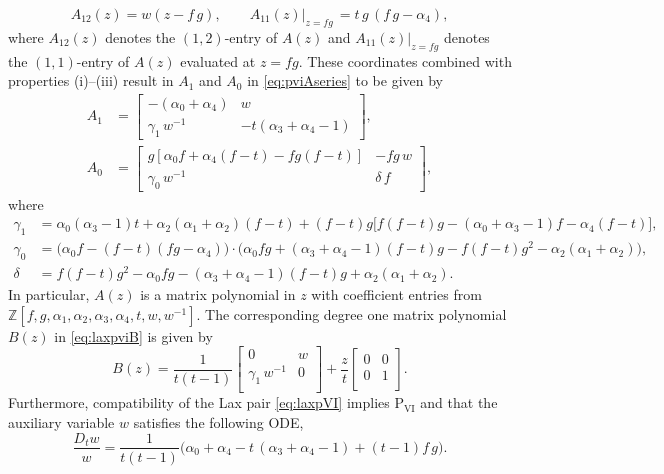\documentclass[a4paper,reqno]{amsart}
\numberwithin{equation}{section}
\numberwithin{figure}{section}
\theoremstyle{remark}
\newcommand\Psix{\textrm{P}_{\textrm{VI}}}
\begin{document}
\begin{equation*}
    A_{12}(z)=w(z-f\,g),\qquad A_{11}(z)|_{z=fg}\,=t\,g\,(f\,g-\alpha_4),
\end{equation*}
where $A_{12}(z)$ denotes the $(1,2)$-entry of $A(z)$ and $A_{11}(z)|_{z=fg}$ denotes the $(1,1)$-entry of $A(z)$ evaluated at $z=fg$. These coordinates combined with properties (i)--(iii) result in $A_1$ and $A_0$ in \eqref{eq:pviAseries} to be given by
\begin{align*}
A_1&=\begin{bmatrix}
 -(\alpha _0+\alpha _4) & w \\
\gamma_1 \,w^{-1} & -t(\alpha _3+\alpha _4-1)
\end{bmatrix},\\
A_0&=\begin{bmatrix}
 g [\alpha _0 f+\alpha _4 (f-t)-f g (f-t)] & -f g\, w \\
 \gamma_0 \,w^{-1} & \delta\, f
\end{bmatrix},
\end{align*}
where
\begin{align*}
    \gamma_1&=\alpha _0 (\alpha _3-1) t+\alpha _2 (\alpha _1+\alpha _2) (f-t)+(f-t)g\big[f (f-t)g-(\alpha _0+\alpha_3-1) f-\alpha _4(f-t)\big],\\
    \gamma_0&=\big(\alpha _0 f-(f-t) (f g-\alpha _4)\big)  \cdot\big(\alpha _0 f g+(\alpha _3+\alpha _4-1)  (f-t)g-f  (f-t)g^2-\alpha _2 (\alpha _1+\alpha _2)\big),\\
    \delta&=f  (f-t)g^2-\alpha _0 f g-(\alpha _3+\alpha _4-1)  (f-t)g+\alpha _2 (\alpha _1+\alpha _2).
\end{align*}
In particular, $A(z)$ is a matrix polynomial in $z$ with coefficient entries from $\mathbb{Z}[f,g,\alpha_1,\alpha_2,\alpha_3,\alpha_4,t,w,w^{-1}]$. The corresponding degree one matrix polynomial $B(z)$ in \eqref{eq:laxpviB} is given by
\begin{equation*}
    B(z)=\frac{1}{t(t-1)}\begin{bmatrix}
 0 & w \\
 \gamma_1\,w^{-1} & 0 \\
\end{bmatrix}+\frac{z}{t}\begin{bmatrix}
 0 & 0 \\
 0 & 1\\
\end{bmatrix}.
\end{equation*}
 Furthermore, compatibility of the Lax pair \eqref{eq:laxpVI} implies $\Psix$ and that the auxiliary variable $w$ satisfies the following ODE,
\begin{equation*}
    \frac{D_tw}{w}=\frac{1}{t(t-1)}\big(\alpha_0+\alpha_4-t\,(\alpha_3+\alpha_4-1)+(t-1)f\,g\big).
\end{equation*}
\end{document}
